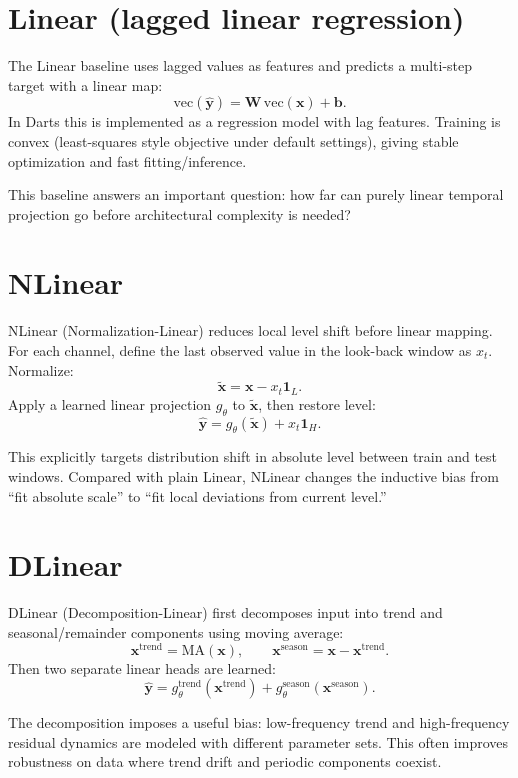 \documentclass[11pt]{article}
\begin{document}
\section{Linear (lagged linear regression)}
The Linear baseline uses lagged values as features and predicts a multi-step target with a linear map:
\[
\mathrm{vec}(\hat{\mathbf{y}})=\mathbf{W}\,\mathrm{vec}(\mathbf{x})+\mathbf{b}.
\]
In Darts this is implemented as a regression model with lag features. Training is convex (least-squares style objective under default settings), giving stable optimization and fast fitting/inference.

This baseline answers an important question: how far can purely linear temporal projection go before architectural complexity is needed?

\section{NLinear}
NLinear (Normalization-Linear) reduces local level shift before linear mapping. For each channel, define the last observed value in the look-back window as $x_t$. Normalize:
\[
\tilde{\mathbf{x}} = \mathbf{x} - x_t\mathbf{1}_L.
\]
Apply a learned linear projection $g_\theta$ to $\tilde{\mathbf{x}}$, then restore level:
\[
\hat{\mathbf{y}} = g_\theta(\tilde{\mathbf{x}}) + x_t\mathbf{1}_H.
\]

This explicitly targets distribution shift in absolute level between train and test windows. Compared with plain Linear, NLinear changes the inductive bias from ``fit absolute scale'' to ``fit local deviations from current level.''

\section{DLinear}
DLinear (Decomposition-Linear) first decomposes input into trend and seasonal/remainder components using moving average:
\[
\mathbf{x}^{\text{trend}}=\mathrm{MA}(\mathbf{x}),\qquad
\mathbf{x}^{\text{season}}=\mathbf{x}-\mathbf{x}^{\text{trend}}.
\]
Then two separate linear heads are learned:
\[
\hat{\mathbf{y}}=g^{\text{trend}}_\theta(\mathbf{x}^{\text{trend}})+g^{\text{season}}_\theta(\mathbf{x}^{\text{season}}).
\]

The decomposition imposes a useful bias: low-frequency trend and high-frequency residual dynamics are modeled with different parameter sets. This often improves robustness on data where trend drift and periodic components coexist.
\end{document}

